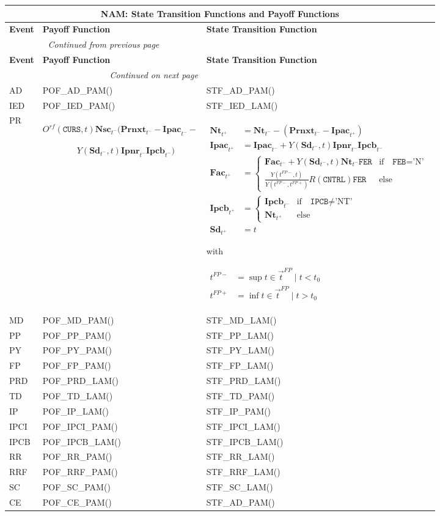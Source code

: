 \documentclass[9pt,oneside]{amsart}
\newenvironment{functions}[1]{
	\hfill %
    	\begin{longtable}{| p{0.05\textwidth} | p{0.42\textwidth} |  p{0.48\textwidth} |}
	\multicolumn{3}{c}{\textbf{#1: State Transition Functions and Payoff Functions}}\\
	\hline
	\textbf{Event} & \textbf{Payoff Function} & \textbf{State Transition Function}\\
	\hline
	\endfirsthead
	\multicolumn{2}{c}{\textit{Continued from previous page}} \\
	\hline
	\textbf{Event} & \textbf{Payoff Function} & \textbf{State Transition Function}\\
	\hline
	\endhead
	\hline \multicolumn{2}{r}{\textit{Continued on next page}} \\
	\endfoot
	\endlastfoot
}{%
	\hline
    	\end{longtable}
}
\newcommand{\svar}[2]{\textbf{#1}_{#2}}
\newcommand{\attr}[1]{\texttt{#1}}
\newcommand{\stf}[2]{STF\_#1\_#2()}
\newcommand{\pof}[2]{POF\_#1\_#2()}
\newcommand{\sgn}{R(\attr{CNTRL})}
\newcommand{\yfr}[2]{Y(#1,#2)}
\newcommand{\obs}[3]{O^{#1}(#2,#3)}
\begin{document}
\begin{functions}{NAM}
	AD & \pof{AD}{PAM} & \stf{AD}{PAM} \\
	\hline
	IED & \pof{IED}{PAM} & \stf{IED}{LAM} \\
	\hline
	PR & $\obs{rf}{\attr{CURS}}{t}\svar{Nsc}{t^-}(\svar{Prnxt}{t^-}-\svar{Ipac}{t^-}-$\par $\qquad\qquad \yfr{\svar{Sd}{t^-}}{t}\svar{Ipnr}{t^-}\svar{Ipcb}{t^-})$
		& {$\begin{aligned}
			\svar{Nt}{t^+} &= \svar{Nt}{t^-}-(\svar{Prnxt}{t^-}-\svar{Ipac}{t^+}) \\
			\svar{Ipac}{t^+} &= \svar{Ipac}{t^-} + \yfr{\svar{Sd}{t^-}}{t}\svar{Ipnr}{t^-}\svar{Ipcb}{t^-} \\
			\svar{Fac}{t^+} &= \begin{cases} \svar{Fac}{t^-} + \yfr{\svar{Sd}{t^-}}{t}\svar{Nt}{t^-}\attr{FER} & \text{if} \quad \attr{FEB}=\text{'N'} \\
					\frac{\yfr{t^{FP-}}{t}}{\yfr{t^{FP-}}{t^{FP+}}}\sgn\attr{FER} & \text{else} \end{cases} \\
			\svar{Ipcb}{t^+} &= \begin{cases} \svar{Ipcb}{t^-} & \text{if}\quad \attr{IPCB}\neq\text{'NT'} \\
							\svar{Nt}{t^+} & \text{else} \end{cases}\\
			\svar{Sd}{t^+} &= t \end{aligned}$} \par
	with\par
		{$\begin{aligned}
			t^{FP-} &= \sup t \in \vec{t}^{FP}\mid t<t_0 \\
			t^{FP+} &= \inf t \in \vec{t}^{FP}\mid t>t_0 \end{aligned}$} \\
	\hline
	MD & \pof{MD}{PAM} & \stf{MD}{LAM} \\
	\hline
	PP & \pof{PP}{PAM}
		& \stf{PP}{LAM} \\
	\hline
	PY & \pof{PY}{PAM}
		& \stf{PY}{LAM} \\
	\hline
	FP & \pof{FP}{PAM}
		& \stf{FP}{LAM} \\
	\hline
  	PRD & \pof{PRD}{LAM}
		& \stf{PRD}{LAM} \\
	\hline
  	TD & \pof{TD}{LAM}
		& \stf{TD}{PAM} \\
	\hline
	IP & \pof{IP}{LAM}
		& \stf{IP}{PAM} \\
	\hline
	IPCI & \pof{IPCI}{PAM}
		& \stf{IPCI}{LAM} \\
	\hline
	IPCB & \pof{IPCB}{LAM}
		& \stf{IPCB}{LAM} \\
	\hline
	RR & \pof{RR}{PAM}
		& \stf{RR}{LAM} \\
	\hline
	RRF & \pof{RRF}{PAM}
		& \stf{RRF}{LAM} \\
	\hline
	SC & \pof{SC}{PAM}
		& \stf{SC}{LAM} \\
	\hline
	CE & \pof{CE}{PAM} & \stf{AD}{PAM} \\
\end{functions}
\end{document}
